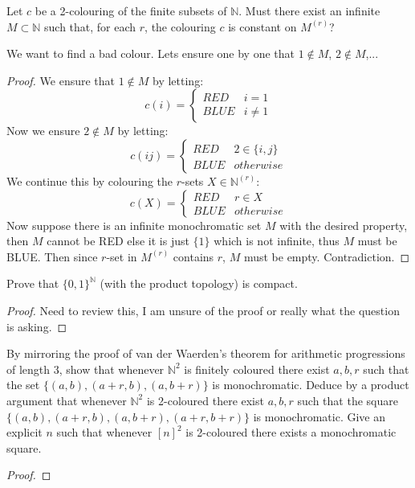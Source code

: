 \documentclass[a4paper]{article}
\begin{document}
	\begin{question}[Question 4]
	Let $c$ be a 2-colouring  of the finite subsets of $\mathbb{N}$. Must there exist an infinite $M \subset \mathbb{N}$ such that, for each $r$, the colouring $c$ is constant on $M^{(r)}$?
	\end{question}
	\begin{idea}
	We want to find a bad colour. Lets ensure one by one that $1 \not\in M$, $2 \not\in M$,...
	\end{idea}
	\begin{proof}
	We ensure that $1 \not\in M$ by letting:
	\[c(i) = \begin{cases} 
      RED & i=1 \\
      BLUE & i\not=1
   \end{cases}
\]
Now we ensure $2 \not\in M$ by letting:
	\[c(ij) = \begin{cases} 
      RED &2 \in \{i,j\} \\
      BLUE & otherwise
   \end{cases}
\]
We continue this by colouring the $r$-sets $X \in \mathbb{N}^{(r)}$:
	\[c(X) = \begin{cases} 
      RED &r \in X \\
      BLUE & otherwise
   \end{cases}
\]
Now suppose there is an infinite monochromatic set $M$ with the desired property, then $M$ cannot be RED else it is just $\{1\}$ which is not infinite, thus $M$ must be BLUE. Then since $r$-set in $M^{(r)}$ contains $r$, $M$ must be empty. Contradiction.
	\end{proof}
	
	\begin{question}[Question 5]
	Prove that $\{0,1\}^{\mathbb{N}}	$ (with the product topology) is compact.
	\end{question}
	\begin{proof}
	Need to review this, I am unsure of the proof or really what the question is asking.
	\end{proof}
	
	\begin{question}[Question 6]
	By mirroring the proof of van der Waerden's theorem for arithmetic progressions of length 3, show that whenever $\mathbb{N}^2$ is finitely coloured there exist $a,b,r$ such that the set $\{(a,b), (a+r,b), (a, b+r)\}$ is monochromatic. Deduce by a product argument that whenever $\mathbb{N}^2$ is 2-coloured there exist $a,b,r$ such that the square $\{(a,b), (a+r,b), (a, b+r), (a+r,b+r)\}$ is monochromatic. Give an explicit $n$ such that whenever $[n]^2$ is 2-coloured there exists a monochromatic square.
	\end{question}
	\begin{proof}
	\end{proof}
	
\end{document}
